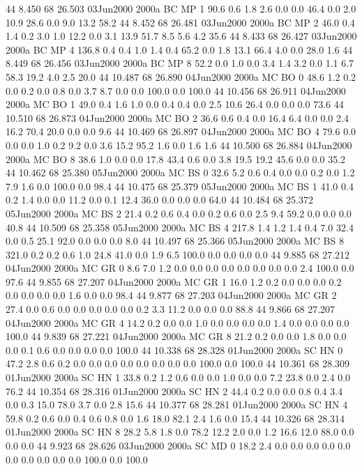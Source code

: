 44 8.450	68 26.503	03Jun2000	2000a	BC	MP	1	90.6	0.6	1.8	2.6	0.0	0.0	46.4	0.0	2.0	10.9	28.6	0.0	9.0	13.2	58.2
44 8.452	68 26.481	03Jun2000	2000a	BC	MP	2	46.0	0.4	1.4	0.2	3.0	1.0	12.2	0.0	3.1	13.9	51.7	8.5	5.6	4.2	35.6
44 8.433	68 26.427	03Jun2000	2000a	BC	MP	4	136.8	0.4	0.4	1.0	1.4	0.4	65.2	0.0	1.8	13.1	66.4	4.0	0.0	28.0	1.6
44 8.449	68 26.456	03Jun2000	2000a	BC	MP	8	52.2	0.0	1.0	0.0	3.4	1.4	3.2	0.0	1.1	6.7	58.3	19.2	4.0	2.5	20.0
44 10.487	68 26.890	04Jun2000	2000a	MC	BO	0	48.6	1.2	0.2	0.0	0.2	0.0	0.8	0.0	3.7	8.7	0.0	0.0	100.0	0.0	100.0
44 10.456	68 26.911	04Jun2000	2000a	MC	BO	1	49.0	0.4	1.6	1.0	0.0	0.4	0.4	0.0	2.5	10.6	26.4	0.0	0.0	0.0	73.6
44 10.510	68 26.873	04Jun2000	2000a	MC	BO	2	36.6	0.6	0.4	0.0	16.4	6.4	0.0	0.0	2.4	16.2	70.4	20.0	0.0	0.0	9.6
44 10.469	68 26.897	04Jun2000	2000a	MC	BO	4	79.6	0.0	0.0	0.0	1.0	0.2	9.2	0.0	3.6	15.2	95.2	1.6	0.0	1.6	1.6
44 10.500	68 26.884	04Jun2000	2000a	MC	BO	8	38.6	1.0	0.0	0.0	17.8	43.4	0.6	0.0	3.8	19.5	19.2	45.6	0.0	0.0	35.2
44 10.462	68 25.380	05Jun2000	2000a	MC	BS	0	32.6	5.2	0.6	0.4	0.0	0.0	0.2	0.0	1.2	7.9	1.6	0.0	100.0	0.0	98.4
44 10.475	68 25.379	05Jun2000	2000a	MC	BS	1	41.0	0.4	0.2	1.4	0.0	0.0	11.2	0.0	0.1	12.4	36.0	0.0	0.0	0.0	64.0
44 10.484	68 25.372	05Jun2000	2000a	MC	BS	2	21.4	0.2	0.6	0.4	0.0	0.2	0.6	0.0	2.5	9.4	59.2	0.0	0.0	0.0	40.8
44 10.509	68 25.358	05Jun2000	2000a	MC	BS	4	217.8	1.4	1.2	1.4	0.4	7.0	32.4	0.0	0.5	25.1	92.0	0.0	0.0	0.0	8.0
44 10.497	68 25.366	05Jun2000	2000a	MC	BS	8	321.0	0.2	0.2	0.6	1.0	24.8	41.0	0.0	1.9	6.5	100.0	0.0	0.0	0.0	0.0
44 9.885	68 27.212	04Jun2000	2000a	MC	GR	0	8.6	7.0	1.2	0.0	0.0	0.0	0.0	0.0	0.0	0.0	0.0	2.4	100.0	0.0	97.6
44 9.855	68 27.207	04Jun2000	2000a	MC	GR	1	16.0	1.2	0.2	0.0	0.0	0.0	0.2	0.0	0.0	0.0	0.0	1.6	0.0	0.0	98.4
44 9.877	68 27.203	04Jun2000	2000a	MC	GR	2	27.4	0.0	0.6	0.0	0.0	0.0	0.0	0.0	0.2	3.3	11.2	0.0	0.0	0.0	88.8
44 9.866	68 27.207	04Jun2000	2000a	MC	GR	4	14.2	0.2	0.0	0.0	1.0	0.0	0.0	0.0	0.0	1.4	0.0	0.0	0.0	0.0	100.0
44 9.839	68 27.221	04Jun2000	2000a	MC	GR	8	21.2	0.2	0.0	0.0	1.8	0.0	0.0	0.0	0.1	0.6	0.0	0.0	0.0	0.0	100.0
44 10.338	68 28.328	01Jun2000	2000a	SC	HN	0	47.2	2.8	0.6	0.2	0.0	0.0	0.0	0.0	0.0	0.0	0.0	0.0	100.0	0.0	100.0
44 10.361	68 28.309	01Jun2000	2000a	SC	HN	1	33.8	0.2	1.2	0.6	0.0	0.0	1.0	0.0	0.0	7.2	23.8	0.0	2.4	0.0	76.2
44 10.354	68 28.316	01Jun2000	2000a	SC	HN	2	44.4	0.2	0.0	0.0	0.8	0.4	3.4	0.0	0.3	15.0	78.0	3.7	0.0	2.8	15.6
44 10.377	68 28.281	01Jun2000	2000a	SC	HN	4	59.8	0.2	0.6	0.0	0.4	0.6	0.8	0.0	1.6	18.0	82.1	2.4	1.6	0.0	15.4
44 10.326	68 28.314	01Jun2000	2000a	SC	HN	8	28.2	5.8	1.8	0.0	78.2	12.2	2.0	0.0	1.2	16.6	12.0	88.0	0.0	0.0	0.0
44 9.923	68 28.626	03Jun2000	2000a	SC	MD	0	18.2	2.4	0.0	0.0	0.0	0.0	0.0	0.0	0.0	0.0	0.0	0.0	100.0	0.0	100.0
